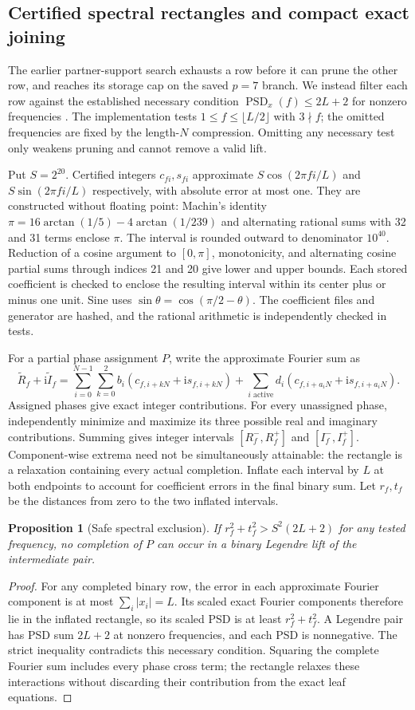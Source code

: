\documentclass[11pt]{article}
\newtheorem{proposition}[theorem]{Proposition}
\newcommand{\PSD}{\operatorname{PSD}}
\begin{document}
\subsection{Certified spectral rectangles and compact exact joining}
The earlier partner-support search exhausts a row before it can prune the
other row, and reaches its storage cap on the saved $p=7$ branch. We instead
filter each row against the established necessary condition
$\PSD_x(f)\le 2L+2$ for nonzero frequencies \cite{fletcher,lumsden}.
The implementation tests $1\le f\le\lfloor L/2\rfloor$ with $3\nmid f$;
the omitted frequencies are fixed by the length-$N$ compression. Omitting
any necessary test only weakens pruning and cannot remove a valid lift.

Put $S=2^{20}$. Certified integers $c_{fi},s_{fi}$ approximate
$S\cos(2\pi fi/L)$ and $S\sin(2\pi fi/L)$ respectively, with absolute error
at most one. They are constructed without floating point: Machin's identity
$\pi=16\arctan(1/5)-4\arctan(1/239)$ and alternating rational sums with
32 and 31 terms enclose $\pi$. The interval is rounded outward to denominator
$10^{40}$. Reduction of a cosine argument to $[0,\pi]$, monotonicity, and
alternating cosine partial sums through indices 21 and 20 give lower and
upper bounds. Each stored coefficient is checked to enclose the resulting
interval within its center plus or minus one unit. Sine uses
$\sin\theta=\cos(\pi/2-\theta)$. The coefficient files and generator are
hashed, and the rational arithmetic is independently checked in tests.

For a partial phase assignment $P$, write the approximate Fourier sum as
\[
 \widetilde R_f+\mathrm{i}\widetilde I_f
 =\sum_{i=0}^{N-1}\sum_{k=0}^2 b_i(c_{f,i+kN}+\mathrm{i}s_{f,i+kN})
 +\sum_{i\text{ active}}d_i(c_{f,i+a_iN}+\mathrm{i}s_{f,i+a_iN}).
\]
Assigned phases give exact integer contributions. For every unassigned
phase, independently minimize and maximize its three possible real and
imaginary contributions. Summing gives integer intervals
$[R_f^-,R_f^+]$ and $[I_f^-,I_f^+]$. Component-wise extrema need not be
simultaneously attainable: the rectangle is a relaxation containing every
actual completion. Inflate each interval by $L$ at both endpoints to
account for coefficient errors in the final binary sum. Let $r_f,t_f$ be
the distances from zero to the two inflated intervals.
\begin{proposition}[Safe spectral exclusion]\label{prop:spectral}
If $r_f^2+t_f^2>S^2(2L+2)$ for any tested frequency, no completion of $P$
can occur in a binary Legendre lift of the intermediate pair.
\end{proposition}
\begin{proof}
For any completed binary row, the error in each approximate Fourier
component is at most $\sum_i|x_i|=L$. Its scaled exact Fourier components
therefore lie in the inflated rectangle, so its scaled PSD is at least
$r_f^2+t_f^2$. A Legendre pair has PSD sum $2L+2$ at nonzero frequencies,
and each PSD is nonnegative. The strict inequality contradicts this
necessary condition. Squaring the complete Fourier sum includes every
phase cross term; the rectangle relaxes these interactions without
discarding their contribution from the exact leaf equations.
\end{proof}
\end{document}
